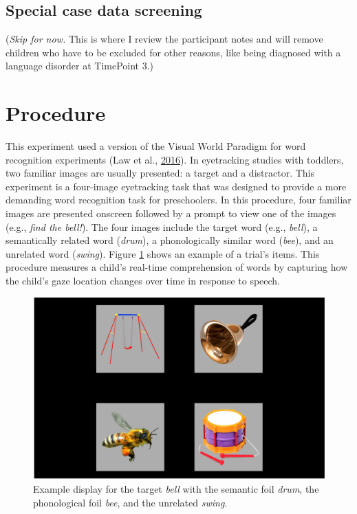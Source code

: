 \documentclass [11pt, proquest] {uwthesis}[2015/03/03]
\begin{document}
\subsection{Special case data
screening}\label{special-case-data-screening}

(\emph{Skip for now.} This is where I review the participant notes and
will remove children who have to be excluded for other reasons, like
being diagnosed with a language disorder at TimePoint 3.)

\section{Procedure}\label{procedure}

This experiment used a version of the Visual World Paradigm for word
recognition experiments (Law et al.,
\protect\hyperlink{ref-RWLPaper}{2016}). In eyetracking studies with
toddlers, two familiar images are usually presented: a target and a
distractor. This experiment is a four-image eyetracking task that was
designed to provide a more demanding word recognition task for
preschoolers. In this procedure, four familiar images are presented
onscreen followed by a prompt to view one of the images (e.g.,
\emph{find the bell!}). The four images include the target word (e.g.,
\emph{bell}), a semantically related word (\emph{drum}), a
phonologically similar word (\emph{bee}), and an unrelated word
(\emph{swing}). Figure \ref{fig:sample-vw-screen} shows an example of a
trial's items. This procedure measures a child's real-time comprehension
of words by capturing how the child's gaze location changes over time in
response to speech.




\begin{figure}
\includegraphics[width=1\linewidth]{./misc/rwl-screens/TimePoint1/actual/Block2_17_swing2_bell2_bee2_drum2_UpperRightImage_bell} \caption{Example display for the target \emph{bell}
with the semantic foil \emph{drum}, the phonological foil \emph{bee},
and the unrelated \emph{swing}.}\label{fig:sample-vw-screen}
\end{figure}
\end{document}
